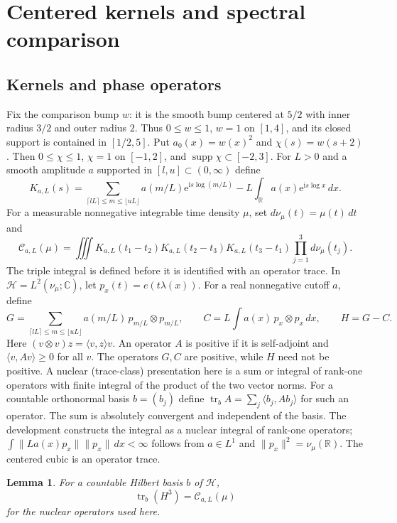 \documentclass[11pt,a4paper,oneside]{article}
\newtheorem{lemma}[theorem]{Lemma}
\theoremstyle{definition}
\newcommand{\R}{\mathbb R}
\newcommand{\C}{\mathbb C}
\newcommand{\ii}{\mathrm i}
\newcommand{\e}{\mathrm e}
\newcommand{\tr}{\operatorname{tr}}
\newcommand{\supp}{\operatorname{supp}}
\numberwithin{equation}{section}
\begin{document}
\section{Centered kernels and spectral comparison}\label{ch:cubic}
\subsection{Kernels and phase operators}
Fix the comparison bump $w$: it is the smooth bump centered at $5/2$
with inner radius $3/2$ and outer radius $2$. Thus $0\le w\le1$,
$w=1$ on $[1,4]$, and its closed support is contained in $[1/2,5]$.
Put $a_0(x)=w(x)^2$ and $\chi(s)=w(s+2)$.
Then $0\le\chi\le1$, $\chi=1$ on $[-1,2]$, and
$\supp\chi\subset[-2,3]$.
For $L>0$ and a smooth amplitude $a$ supported in $[l,u]\subset(0,\infty)$ define
\begin{equation}\label{eq:kernel}
 K_{a,L}(s)=\sum_{\lceil lL\rceil\le m\le\lfloor uL\rfloor}
             a(m/L)\e^{\ii s\log(m/L)}
           -L\int_\R a(x)\e^{\ii s\log x}\,dx.
\end{equation}
For a measurable nonnegative integrable time density $\mu$, set
$d\nu_\mu(t)=\mu(t)\,dt$ and
\[
 \mathcal C_{a,L}(\mu)=\iiint
 K_{a,L}(t_1-t_2)K_{a,L}(t_2-t_3)K_{a,L}(t_3-t_1)
 \prod_{j=1}^3d\nu_\mu(t_j).
\]
The triple integral is defined before it is identified with an operator trace.
In $\mathcal H=L^2(\nu_\mu;\C)$, let
$p_x(t)=e(t\lambda(x))$. For a real nonnegative cutoff $a$, define
\[
 G=\sum_{\lceil lL\rceil\le m\le\lfloor uL\rfloor}
 a(m/L)\,p_{m/L}\otimes p_{m/L},\qquad
 C=L\int a(x)\,p_x\otimes p_x\,dx,\qquad H=G-C.
\]
Here $(v\otimes v)z=\langle v,z\rangle v$.
An operator $A$ is positive if it is self-adjoint and $\langle v,Av\rangle\ge0$ for all $v$. The operators $G,C$ are positive, while $H$ need not be positive. A nuclear (trace-class) presentation here is a sum or integral of rank-one operators with finite integral of the product of the two vector norms. For a countable orthonormal basis $b=(b_j)$ define $\tr_b A=\sum_j\langle b_j,Ab_j\rangle$ for such an operator. The sum is absolutely convergent and independent of the basis.
The development constructs the integral as a nuclear integral of rank-one operators;
$\int\|La(x)p_x\|\|p_x\|\,dx<\infty$ follows from $a\in L^1$ and
$\|p_x\|^2=\nu_\mu(\R)$.
The centered cubic is an operator trace.
\begin{lemma}
For a countable Hilbert basis $b$ of $\mathcal H$,
\[
 \tr_b(H^3)=\mathcal C_{a,L}(\mu)
\]
for the nuclear operators used here.
\end{lemma}
\end{document}
